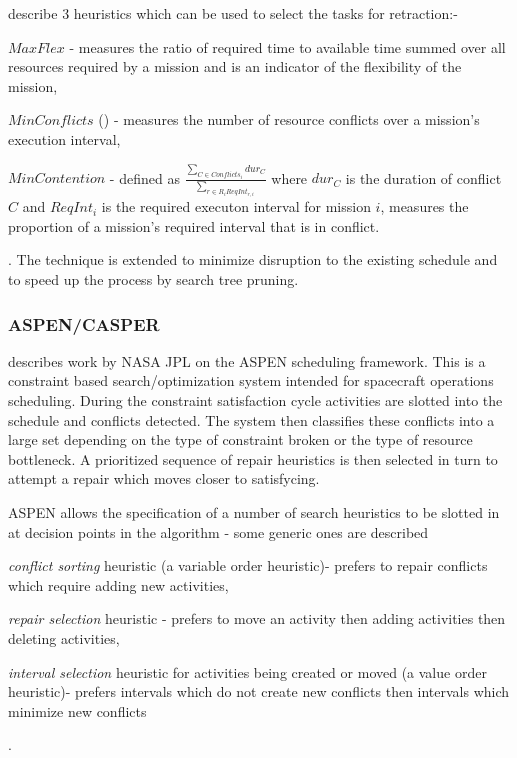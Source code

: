 \citet{kramer03maxflex} describe 3 heuristics which can be used to select the tasks for retraction:- \begin{inparaenum} \item $MaxFlex$ - measures the ratio of required time to available time summed over all resources required by a mission and is an indicator of the flexibility of the mission, \item $MinConflicts$ (\citep{minton92minconflicts}) - measures the number of resource conflicts over a mission's execution interval, \item $MinContention$ - defined as $\frac {\sum_{C \in Conflicts_i} dur_C}{\sum_{r \in R_i ReqInt_{r,i}}}$ where $dur_C$ is the duration of conflict $C$ and $ReqInt_i$ is the required executon interval for mission $i$, measures the proportion of a mission's required interval that is in conflict. \end{inparaenum}. The technique is extended \citep{kramer04swapping} to minimize disruption to the existing schedule and to speed up the process by search tree pruning.



\subsubsection{ASPEN/CASPER}
\citet{rabideau99iterative} describes work by NASA JPL on the ASPEN scheduling framework. This is a constraint based search/optimization system intended for spacecraft operations scheduling. During the constraint satisfaction cycle activities are slotted into the schedule and conflicts detected. The system then classifies these conflicts into a large set depending on the type of constraint broken or the type of resource bottleneck. A prioritized sequence of repair heuristics is then selected in turn to attempt a repair which moves closer to satisfycing.

 ASPEN allows the specification of a number of search heuristics to be slotted in at decision points in the algorithm - some generic ones are described \begin{inparaenum} \item \emph{conflict sorting} heuristic (a variable order heuristic)- prefers to repair conflicts which require adding new activities, \item \emph{repair selection} heuristic - prefers to move an activity then adding activities then deleting activities, \item \emph{interval selection} heuristic for activities being created or moved (a value order heuristic)- prefers intervals which do not create new conflicts then intervals which minimize new conflicts \end{inparaenum}.


